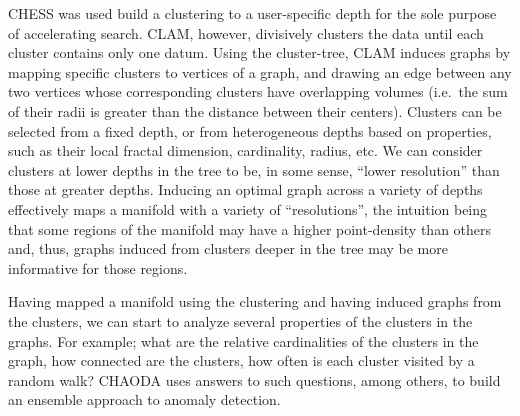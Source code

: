 CHESS was used build a clustering to a user-specific depth for the sole purpose of accelerating search.
CLAM, however, divisively clusters the data until each cluster contains only one datum.
Using the cluster-tree, CLAM induces graphs by mapping specific clusters to vertices of a graph, and drawing an edge between any two vertices whose corresponding clusters have overlapping volumes (i.e.\ the sum of their radii is greater than the distance between their centers).
Clusters can be selected from a fixed depth, or from heterogeneous depths based on properties, such as their local fractal dimension, cardinality, radius, etc.
We can consider clusters at lower depths in the tree to be, in some sense, ``lower resolution'' than those at greater depths.
Inducing an optimal graph across a variety of depths effectively maps a manifold with a variety of ``resolutions'', the intuition being that some regions of the manifold may have a higher point-density than others and, thus, graphs induced from clusters deeper in the tree may be more informative for those regions.

Having mapped a manifold using the clustering and having induced graphs from the clusters, we can start to analyze several properties of the clusters in the graphs.
For example; what are the relative cardinalities of the clusters in the graph, how connected are the clusters, how often is each cluster visited by a random walk?
CHAODA uses answers to such questions, among others, to build an ensemble approach to anomaly detection.
